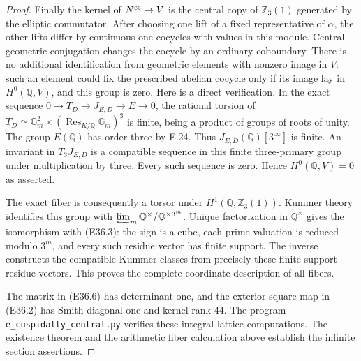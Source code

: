 \begin{proof}
Finally the kernel of $N^{\rm cc}\to V$ is the central
copy of $\mathbb Z_3(1)$ generated by the elliptic
commutator. After choosing one lift of a fixed
representative of $\alpha$, the other lifts differ by
continuous one-cocycles with values in this module.
Central geometric conjugation changes the cocycle by
an ordinary coboundary. There is no additional
identification from geometric elements with nonzero
image in $V$: such an element could fix the prescribed
abelian cocycle only if its image lay in
$H^0(\mathbb Q,V)$, and this group is zero.
Here is a direct verification. In the exact sequence
$0\to T_D\to J_{E,D}\to E\to0$, the rational torsion
of $T_D\simeq\mathbb G_m^2\times
(\operatorname{Res}_{K/\mathbb Q}\mathbb G_m)^3$
is finite, being a product of groups of roots of unity.
The group $E(\mathbb Q)$ has order three by E.24.
Thus $J_{E,D}(\mathbb Q)[3^\infty]$ is finite.
An invariant in $T_3J_{E,D}$ is a compatible sequence
in this finite three-primary group under multiplication
by three. Every such sequence is zero. Hence
$H^0(\mathbb Q,V)=0$ as asserted.

The exact fiber is consequently a torsor under
$H^1(\mathbb Q,\mathbb Z_3(1))$.
Kummer theory identifies this group with
$\varprojlim_m\mathbb Q^\times/\mathbb Q^{\times3^m}$.
Unique factorization in $\mathbb Q^\times$ gives the
isomorphism with (E36.3): the sign is a cube, each
prime valuation is reduced modulo $3^m$, and every
such residue vector has finite support. The inverse
constructs the compatible Kummer classes from precisely
these finite-support residue vectors. This proves the
complete coordinate description of all fibers.

The matrix in (E36.6) has determinant one, and the
exterior-square map in (E36.2) has Smith diagonal one
and kernel rank $44$. The program
\texttt{e\_cuspidally\_central.py} verifies these integral
lattice computations. The existence theorem and the
arithmetic fiber calculation above establish the
infinite section assertions.
\end{proof}
